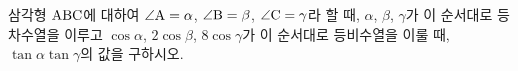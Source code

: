 삼각형 $\mathrm{ABC}$에 대하여 $\angle\mathrm{A}=\alpha$, $\angle\mathrm{B}=\beta$, $\angle\mathrm{C}=\gamma$라 할 때, $\alpha$, $\beta$, $\gamma$가 이 순서대로 등차수열을 이루고 $\cos\alpha$, $2\cos\beta$, $8\cos\gamma$가 이 순서대로 등비수열을 이룰 때, $\tan\alpha\tan\gamma$의 값을 구하시오. \cond{$\alpha<\beta<\gamma$}
